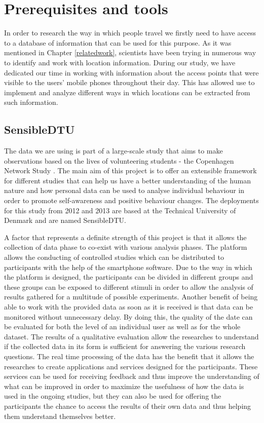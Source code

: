 \chapter{Prerequisites and tools}
In order to research the way in which people travel we firstly need to have
access to a database of information that can be used for this purpose. As it was
mentioned in Chapter \ref{relatedwork}, scientists have been trying in numerous
way to identify and work with location information. During our study, we have
dedicated our time in working with information about the access points that were
visible to the users' mobile phones throughout their day. This has allowed use
to implement and analyze different ways in which locations can be extracted from
such information.

\section{SensibleDTU}
\label{sensible_dtu}

The data we are using is part of a large-scale study that aims to make
observations based on the lives of volunteering students - the Copenhagen
Network Study \cite{Stopczynski14m}. The main aim of this project is to offer an
extensible framework for different studies that can help us have a better
understanding of the human nature and how personal data can be used to analyse
individual behaviour in order to promote self-awareness and positive behaviour
changes. The deployments for this study from 2012 and 2013 are based at the
Technical University of Denmark and are named SensibleDTU. 

A factor that represents a definite strength of this project is that it allows
the collection of data phase to co-exist with various analysis phases. The
platform allows the conducting of controlled studies which can be distributed to
participants with the help of the smartphone software. Due to the way in which
the platform is designed, the participants can be divided in different groups
and these groups can be exposed to different stimuli in order to allow the
analysis of results gathered for a multitude of possible experiments. Another
benefit of being able to work with the provided data as soon as it is received
is that data can be monitored without unnecessary delay. By doing this, the
quality of the date can be evaluated for both the level of an individual user as
well as for the whole dataset. The results of a qualitative evaluation allow the
researches to understand if the collected data in its form is sufficient for
answering the various research questions. The real time processing of the data
has the benefit that it allows the researches to create applications and
services designed for the participants. These services can be used for receiving
feedback and thus improve the understanding of what can be improved in order to
maximize the usefulness of how the data is used in the ongoing studies, but they
can also be used for offering the participants the chance to access the results
of their own data and thus helping them understand themselves better.

